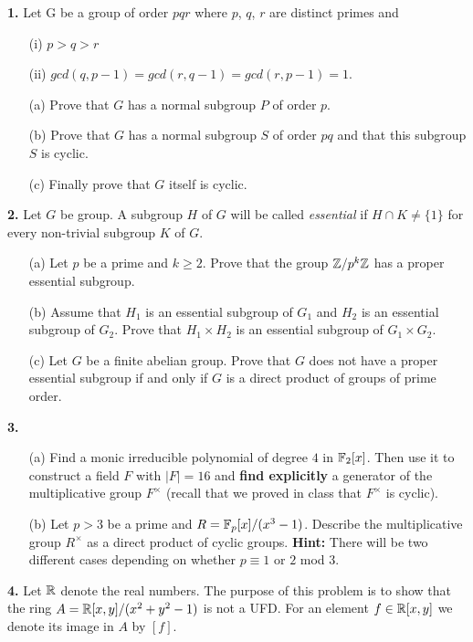 \documentclass[12pt]{article}
\begin{document}
\skv
{\bf 1.} Let G be a group of order $pqr$ where $p$, $q$, $r$ are 
distinct primes and 
\begin{itemize}
\item[(i)] $p > q > r$
\item[(ii)] $gcd(q, p - 1) = gcd(r, q - 1) = gcd(r, p - 1) = 1$.
\end{itemize}
\begin{itemize}
\item[(a)] Prove that $G$ has a normal subgroup $P$ of order $p$.
\item[(b)] Prove that $G$ has a normal subgroup $S$ of order $pq$
and that this subgroup $S$ is cyclic.
\item[(c)] Finally prove that $G$ itself is cyclic.
\end{itemize}
\skv
{\bf 2.} Let $G$ be group. A subgroup $H$ of $G$ will be called {\it essential}
if $H\cap K\neq \{1\}$ for every non-trivial subgroup $K$ of $G$.
\begin{itemize}

\item[(a)] Let $p$ be a prime and $k\geq 2$. Prove that the group ${\mathbb Z}/p^k{\mathbb Z}$
has a proper essential subgroup.

\item[(b)] Assume that $H_1$ is an essential subgroup of $G_1$ and $H_2$
is an essential subgroup of $G_2$. Prove that $H_1\times H_2$ is an essential subgroup
of $G_1\times G_2$.

\item[(c)] Let $G$ be a finite abelian group. Prove that $G$ does not have a proper
essential subgroup if and only if $G$ is a direct product of groups of prime order.
\end{itemize}
\skv
{\bf 3.}
\begin{itemize}
\item[(a)] Find a monic irreducible polynomial of degree $4$ in ${\mathbb F}_2[x]$.
Then use it to construct a field $F$ with $|F|=16$ and {\bf find explicitly}
a generator of the multiplicative group $F^{\times}$ (recall that we proved
in class that $F^{\times}$ is cyclic).
\item[(b)] Let $p>3$ be a prime and $R={\mathbb F}_p[x]/(x^3-1)$.
Describe the multiplicative group $R^{\times}$ as a direct product of cyclic groups.
{\bf Hint:} There will be two different cases depending on whether
$p\equiv 1$ or $2$ mod $3$.
\end{itemize}


\skv
{\bf 4.} Let ${\mathbb R}$ denote the real numbers. The purpose of this problem is to show that the ring 
$A={\mathbb R}[x,y]/(x^2+y^2-1)$ is not a UFD. For an element $f\in {\mathbb R}[x,y]$ 
we denote its image in $A$ by $[f]$.
\end{document}
